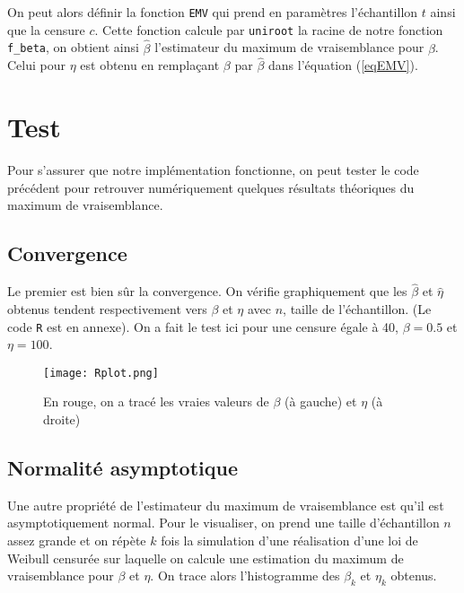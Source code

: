 \documentclass[a4paper]{report}
\begin{document}
 On peut alors définir la fonction \verb|EMV| qui prend en paramètres l'échantillon $t$ ainsi que la censure $c$. Cette fonction calcule par \verb|uniroot| la racine de notre fonction \verb|f_beta|, on obtient ainsi $\hat{\beta}$ l'estimateur du maximum de vraisemblance pour $\beta$. Celui pour $\eta$ est obtenu en remplaçant $\beta$ par $\hat{\beta}$ dans l'équation (\ref{eqEMV}). 


     
\section{Test}

Pour s'assurer que notre implémentation fonctionne, on peut tester le code précédent pour retrouver numériquement quelques résultats théoriques du maximum de vraisemblance.     
    
\subsection{Convergence}

Le premier est bien sûr la convergence. On vérifie graphiquement que les $\hat{\beta}$ et $\hat{\eta}$ obtenus tendent respectivement vers $\beta$ et $\eta$ avec $n$, taille de l'échantillon. (Le code \verb|R| est en annexe). On a fait le test ici pour une censure égale à 40, $\beta = 0.5$ et $\eta=100$.

 \begin{figure}[!ht]
	\centering
     	\texttt{[image: Rplot.png]}

	\caption{En rouge, on a tracé les vraies valeurs de $\beta$ (à gauche) et $\eta$ (à droite)}
\end{figure}

\subsection{Normalité asymptotique}

Une autre propriété de l'estimateur du maximum de vraisemblance est qu'il est asymptotiquement normal. Pour le visualiser, on prend une taille d'échantillon $n$ assez grande et on répète $k$ fois la simulation d'une réalisation d'une loi de Weibull censurée sur laquelle on calcule une estimation du maximum de vraisemblance pour $\beta$ et $\eta$. On trace alors l'histogramme des $\beta_k$ et $\eta_k$ obtenus. 
\end{document}
